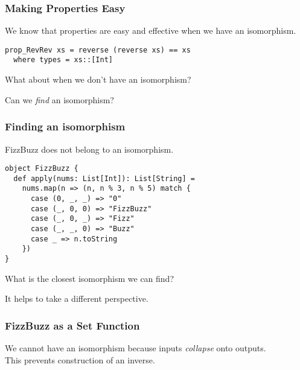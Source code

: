 \documentclass{beamer}
\begin{document}
\begin{frame}[fragile]
\frametitle{Making Properties Easy}

We know that properties are easy and effective when we have 
an isomorphism. \\
\medskip

\begin{verbatim}
prop_RevRev xs = reverse (reverse xs) == xs
  where types = xs::[Int]
\end{verbatim}

\pause
\medskip
What about when we don't have an isomorphism? \\
\pause
\medskip

Can we \emph{find} an isomorphism?

\end{frame}

\begin{frame}[fragile]
\frametitle{Finding an isomorphism}

FizzBuzz does not belong to an isomorphism.
\medskip

\begin{verbatim}
object FizzBuzz {
  def apply(nums: List[Int]): List[String] =
    nums.map(n => (n, n % 3, n % 5) match {
      case (0, _, _) => "0"
      case (_, 0, 0) => "FizzBuzz"
      case (_, 0, _) => "Fizz"
      case (_, _, 0) => "Buzz"
      case _ => n.toString
    })
}
\end{verbatim}

\pause
\medskip
What is the closest isomorphism we can find? \\
\medskip

It helps to take a different perspective.

\end{frame}

\begin{frame}[fragile]
\frametitle{FizzBuzz as a Set Function}
\medskip

We cannot have an isomorphism because inputs \emph{collapse} 
onto outputs. \\
This prevents construction of an inverse.
\end{frame}
\end{document}
